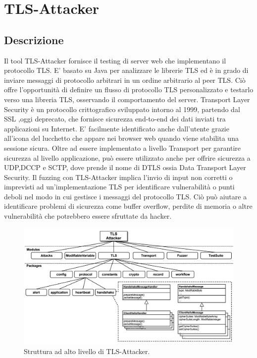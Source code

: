 \chapter{TLS-Attacker}
\section{Descrizione}

Il tool TLS-Attacker fornisce il testing di server web che implementano il protocollo TLS. E' basato su Java per analizzare le librerie TLS ed è in grado di inviare messaggi di protocollo arbitrari in un ordine arbitrario al peer TLS. Ciò offre l'opportunità di definire un flusso di protocollo TLS personalizzato e testarlo verso una libreria TLS, osservando il comportamento del server.
Transport Layer Security è un protocollo crittografico sviluppato intorno al 1999, partendo dal SSL ,oggi deprecato, che fornisce sicurezza end-to-end dei dati inviati tra applicazioni su Internet. E’ facilmente identificato anche dall’utente grazie all'icona del lucchetto che appare nei browser web quando viene stabilita una sessione sicura. Oltre ad essere implementato a livello Transport per garantire sicurezza al livello applicazione, può essere utilizzato anche per offrire sicurezza a UDP,DCCP e SCTP, dove prende il nome di DTLS ossia Data Transport Layer Security.
Il fuzzing con TLS-Attacker implica l'invio di input non corretti o imprevisti ad un'implementazione TLS per identificare vulnerabilità o punti deboli nel modo in cui gestisce i messaggi del protocollo TLS. Ciò può aiutare a identificare problemi di sicurezza come buffer overflow, perdite di memoria o altre vulnerabilità che potrebbero essere sfruttate da hacker.
\FloatBarrier
\begin{figure}[h]
    \centering
    \includegraphics[width = 1.1\textwidth]{images/struttura-tls-attcaker-alto-livello.png}
    \caption{Struttura ad alto livello di TLS-Attacker.}
    \label{fig:enter-label}
\end{figure}
\FloatBarrier
